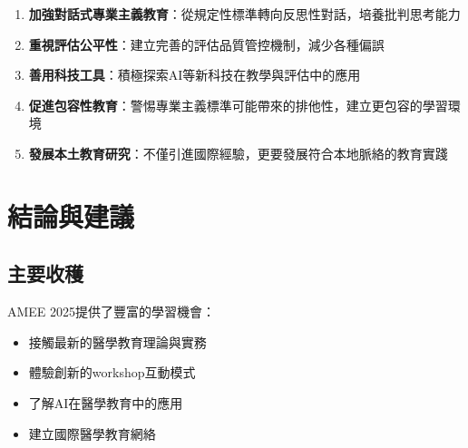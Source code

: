 \documentclass[12pt,a4paper]{article}
\begin{document}
\begin{enumerate}
    \item \textbf{加強對話式專業主義教育}：從規定性標準轉向反思性對話，培養批判思考能力
    \item \textbf{重視評估公平性}：建立完善的評估品質管控機制，減少各種偏誤
    \item \textbf{善用科技工具}：積極探索AI等新科技在教學與評估中的應用
    \item \textbf{促進包容性教育}：警惕專業主義標準可能帶來的排他性，建立更包容的學習環境
    \item \textbf{發展本土教育研究}：不僅引進國際經驗，更要發展符合本地脈絡的教育實踐
\end{enumerate}

\section{結論與建議}

\subsection{主要收穫}

AMEE 2025提供了豐富的學習機會：
\begin{itemize}[nosep]
    \item 接觸最新的醫學教育理論與實務
    \item 體驗創新的workshop互動模式
    \item 了解AI在醫學教育中的應用
    \item 建立國際醫學教育網絡
\end{itemize}



\end{document}
